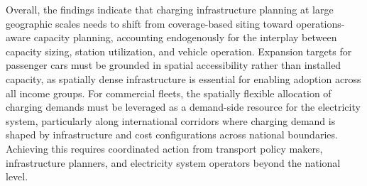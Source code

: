 Overall, the findings indicate that charging infrastructure planning at large geographic scales needs to shift from coverage-based siting toward operations-aware capacity planning, accounting endogenously for the interplay between capacity sizing, station utilization, and vehicle operation. Expansion targets for passenger cars must be grounded in spatial accessibility rather than installed capacity, as spatially dense infrastructure is essential for enabling adoption across all income groups. For commercial fleets, the spatially flexible allocation of charging demands must be leveraged as a demand-side resource for the electricity system, particularly along international corridors where charging demand is shaped by infrastructure and cost configurations across national boundaries. Achieving this requires coordinated action from transport policy makers, infrastructure planners, and electricity system operators beyond the national level.





